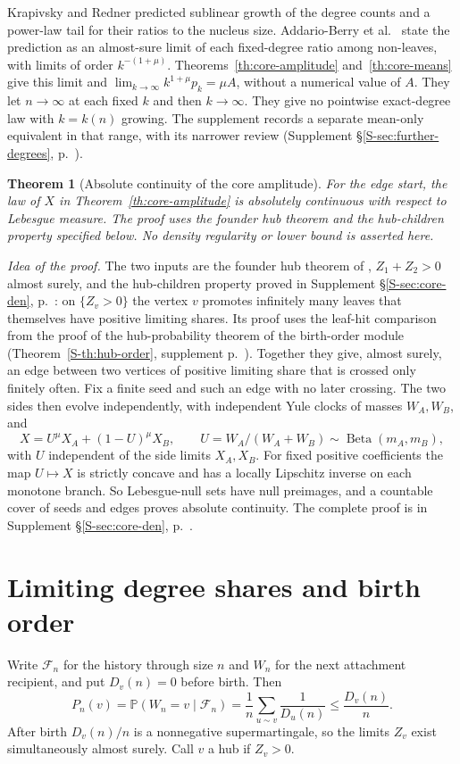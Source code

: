 \documentclass[11pt]{article}
\newtheorem{theorem}{Theorem}
\newcommand{\resulttag}{?}
\newcommand{\tagnext}[1]{\renewcommand{\resulttag}{#1}}
\theoremstyle{remark}
\newcommand{\Prob}{\mathbb P}
\newcommand{\Sref}[1]{Supplement \S\ref{S-#1}, p.~\pageref{S-#1}}
\begin{document}
Krapivsky and Redner \cite[Sec.~5.1]{KR} predicted sublinear growth of the degree counts and a power-law tail for their ratios to the nucleus size. Addario-Berry et al.\ \cite[Sec.~7, Question~2]{AB} state the prediction as an almost-sure limit of each fixed-degree ratio among non-leaves, with limits of order $k^{-(1+\mu)}$. Theorems~\ref{th:core-amplitude} and~\ref{th:core-means} give this limit and $\lim_{k\to\infty}k^{1+\mu}p_k=\mu A$, without a numerical value of $A$. They let $n\to\infty$ at each fixed $k$ and then $k\to\infty$. They give no pointwise exact-degree law with $k=k(n)$ growing. The supplement records a separate mean-only equivalent in that range, with its narrower review (\Sref{sec:further-degrees}).

\tagnext{DEN}
\begin{theorem}[Absolute continuity of the core amplitude]\label{th:core-density}
For the edge start, the law of $X$ in Theorem~\ref{th:core-amplitude} is absolutely continuous with respect to Lebesgue measure. The proof uses the founder hub theorem and the hub-children property specified below. No density regularity or lower bound is asserted here.
\end{theorem}
\emph{Idea of the proof.} The two inputs are the founder hub theorem of \cite[Theorem~3.2]{AB}, $Z_1+Z_2>0$ almost surely, and the hub-children property proved in \Sref{sec:core-den}: on $\{Z_v>0\}$ the vertex $v$ promotes infinitely many leaves that themselves have positive limiting shares. Its proof uses the leaf-hit comparison from the proof of the hub-probability theorem of the birth-order module (Theorem~\ref{S-th:hub-order}, supplement p.~\pageref{S-th:hub-order}). Together they give, almost surely, an edge between two vertices of positive limiting share that is crossed only finitely often. Fix a finite seed and such an edge with no later crossing. The two sides then evolve independently, with independent Yule clocks of masses $W_A,W_B$, and
\[
 X=U^\mu X_A+(1-U)^\mu X_B,\qquad U=W_A/(W_A+W_B)\sim\operatorname{Beta}(m_A,m_B),
\]
with $U$ independent of the side limits $X_A,X_B$. For fixed positive coefficients the map $U\mapsto X$ is strictly concave and has a locally Lipschitz inverse on each monotone branch. So Lebesgue-null sets have null preimages, and a countable cover of seeds and edges proves absolute continuity. The complete proof is in \Sref{sec:core-den}.

\section{Limiting degree shares and birth order}\label{sec:hubs}
Write $\mathcal F_n$ for the history through size $n$ and $W_n$ for the next attachment recipient, and put $D_v(n)=0$ before birth. Then
\[
 P_n(v)=\Prob(W_n=v\mid\mathcal F_n)=\frac1n\sum_{u\sim v}\frac1{D_u(n)}\le \frac{D_v(n)}n .
\]
After birth $D_v(n)/n$ is a nonnegative supermartingale, so the limits $Z_v$ exist simultaneously almost surely. Call $v$ a hub if $Z_v>0$.
\end{document}
